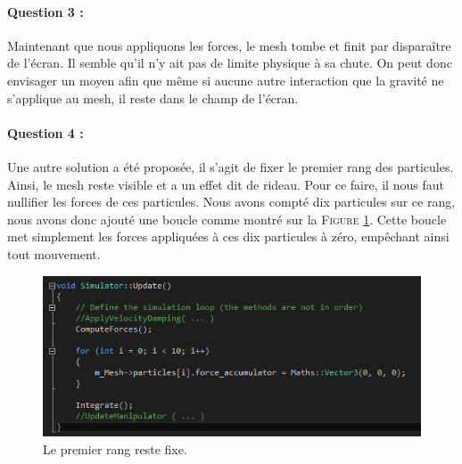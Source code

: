 \documentclass[a4paper,12pt]{article}
\begin{document}
\paragraph{Question 3 :} Maintenant que nous appliquons les forces, le mesh tombe et finit par disparaître de l'écran. Il semble qu'il n'y ait pas de limite physique à sa chute. On peut donc envisager un moyen afin que même si aucune autre interaction que la gravité ne s'applique au mesh, il reste dans le champ de l'écran.

\paragraph{Question 4 :} Une autre solution a été proposée, il s'agit de fixer le premier rang des particules. Ainsi, le mesh reste visible et a un effet dit \og{}de rideau\fg{}. Pour ce faire, il nous faut nullifier les forces de ces particules. Nous avons compté dix particules sur ce rang, nous avons donc ajouté une boucle comme montré sur la \textsc{Figure} \ref{fig:q4}. Cette boucle met simplement les forces appliquées à ces dix particules à zéro, empêchant ainsi tout mouvement.
\begin{figure}
  \centering
  \includegraphics{images/q4.png}
  \caption{Le premier rang reste fixe.}
  \label{fig:q4}
\end{figure}
\end{document}
